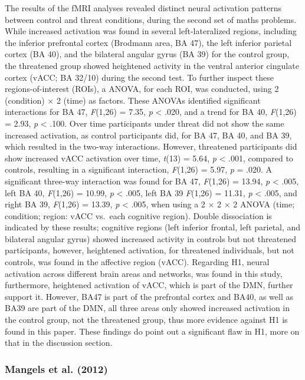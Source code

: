 \documentclass[
  stu,floatsintext]{apa7}
\begin{document}
The results of the fMRI analyses revealed distinct neural activation patterns between control and threat conditions, during the second set of maths problems.
While increased activation was found in several left-lateralized regions, including the inferior prefrontal cortex (Brodmann area, BA 47), the left inferior parietal cortex (BA 40), and the bilateral angular gyrus (BA 39) for the control group, the threatened group showed heightened activity in the ventral anterior cingulate cortex (vACC; BA 32/10) during the second test.
To further inspect these regions-of-interest (ROIs), a ANOVA, for each ROI, was conducted, using 2 (condition) \(\times\) 2 (time) as factors.
These ANOVAs identified significant interactions for BA 47, \emph{F}(1,26) = 7.35, \emph{p} \textless{} .020, and a trend for BA 40, \emph{F}(1,26) = 2.93, \emph{p} \textless{} .100.
Over time participants under threat did not show the same increased activation, as control participants did, for BA 47, BA 40, and BA 39, which resulted in the two-way interactions.
However, threatened participants did show increased vACC activation over time, \emph{t}(13) = 5.64, \emph{p} \textless{} .001, compared to controls, resulting in a significant interaction, \emph{F}(1,26) = 5.97, \emph{p} = .020.
A significant three-way interaction was found for BA 47, \emph{F}(1,26) = 13.94, \emph{p} \textless{} .005, left BA 40, \emph{F}(1,26) = 10.99, \emph{p} \textless{} .005, left BA 39 \emph{F}(1,26) = 11.31, \emph{p} \textless{} .005, and right BA 39, \emph{F}(1,26) = 13.39, \emph{p} \textless{} .005, when using a 2 \(\times\) 2 \(\times\) 2 ANOVA (time; condition; region: vACC vs.~each cognitive region).
Double dissociation is indicated by these results; cognitive regions (left inferior frontal, left parietal, and bilateral angular gyrus) showed increased activity in controls but not threatened participants, however, heightened activation, for threatened individuals, but not controls, was found in the affective region (vACC).
Regarding H1, neural activation across different brain areas and networks, was found in this study, furthermore, heightened activation of vACC, which is part of the DMN, further support it.
However, BA47 is part of the prefrontal cortex and BA40, as well as BA39 are part of the DMN, all three areas only showed increased activation in the control group, not the threatened group, thus more evidence against H1 is found in this paper.
These findings do point out a significant flaw in H1, more on that in the discussion section.

\subsubsection{Mangels et al. (2012)}\label{mangelsemotionblockspath2012}
\end{document}
